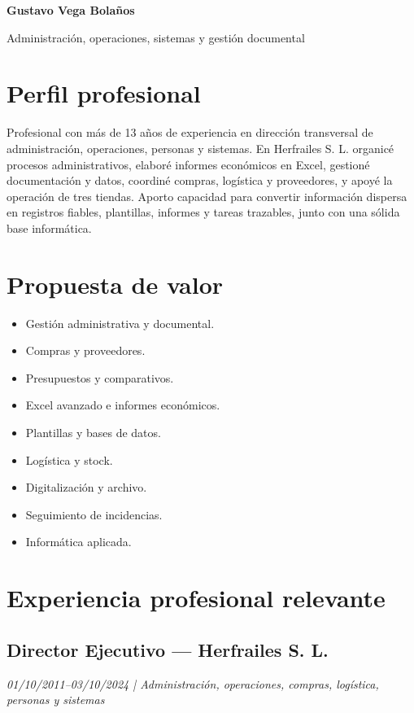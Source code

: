 \documentclass[11pt,a4paper]{article}
\newcommand{\cvtitle}[1]{\begin{center}\LARGE\bfseries\color{azulprincipal}#1\end{center}}
\newcommand{\cvsubtitle}[1]{\begin{center}\large\color{gris}#1\end{center}}
\begin{document}
\cvtitle{Gustavo Vega Bolaños}
\cvsubtitle{Administración, operaciones, sistemas y gestión documental}

\section*{Perfil profesional}
Profesional con más de 13 años de experiencia en dirección transversal de administración, operaciones, personas y sistemas. En Herfrailes S. L. organicé procesos administrativos, elaboré informes económicos en Excel, gestioné documentación y datos, coordiné compras, logística y proveedores, y apoyé la operación de tres tiendas. Aporto capacidad para convertir información dispersa en registros fiables, plantillas, informes y tareas trazables, junto con una sólida base informática.

\section*{Propuesta de valor}
\begin{itemize}
  \item Gestión administrativa y documental.
  \item Compras y proveedores.
  \item Presupuestos y comparativos.
  \item Excel avanzado e informes económicos.
  \item Plantillas y bases de datos.
  \item Logística y stock.
  \item Digitalización y archivo.
  \item Seguimiento de incidencias.
  \item Informática aplicada.
\end{itemize}

\section*{Experiencia profesional relevante}
\subsection*{Director Ejecutivo --- Herfrailes S. L.}
\textit{01/10/2011--03/10/2024 | Administración, operaciones, compras, logística, personas y sistemas}
\end{document}

